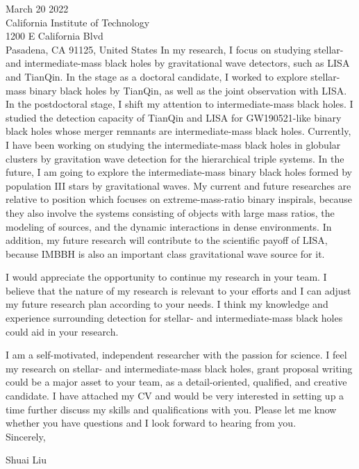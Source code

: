 \documentclass[11pt,a4paper,sans]{letter} %
\begin{document}
\begin{letter}{March 20 2022 \\
California Institute of Technology \\
1200 E California Blvd \\ 
Pasadena, CA 91125, United States}
In my research, I focus on studying stellar- and intermediate-mass black holes by gravitational wave detectors, such
as LISA and TianQin. In the stage as a doctoral candidate, I worked to explore stellar-mass
binary black holes by TianQin, as well as the joint observation with LISA. In the postdoctoral stage, I shift my
attention to intermediate-mass black holes. I studied the detection capacity of TianQin and LISA for
GW190521-like binary black holes whose merger remnants are intermediate-mass black holes. Currently, I have been
working on studying the intermediate-mass black holes in globular clusters by gravitation wave detection for the
hierarchical triple systems. In the future, I am going to explore the intermediate-mass binary black holes formed by
population III stars by gravitational waves. My current and future researches are relative to position which focuses on extreme-mass-ratio binary inspirals, 
because they also involve the systems consisting of objects
with large mass ratios, the modeling of sources, and the dynamic
interactions in dense environments. In addition, my future research will contribute to the
scientific payoff of LISA, because IMBBH is also an important class gravitational wave
source for it.

I would appreciate the opportunity to continue my research in your team. I believe that the nature of my research is
    relevant to your efforts and I can adjust my future research plan according to your needs. I think my knowledge and
experience surrounding detection for stellar- and intermediate-mass black holes could aid in your research.

I am a self-motivated, independent researcher with the passion for science. I feel my research on stellar- and
intermediate-mass black holes, grant proposal writing could be a major asset to your team, as a detail-oriented,
qualified, and creative candidate. I have attached my CV and would be very interested in setting up a time further
discuss my skills and qualifications with you. Please let me know whether you have questions and I look forward to
hearing from you.\\


Sincerely,

Shuai Liu




\end{letter}
\end{document}
